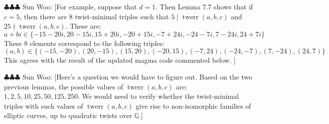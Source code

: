 \documentclass[12pt]{amsart}
\numberwithin{equation}{section} %
\theoremstyle{definition} \newtheorem{definition}[counter]{Definition}
\theoremstyle{remark} \newtheorem{nonexam}[counter]{Non-example}
\newcommand{\spark}[1]{{\color{olive} \sf
    $\clubsuit\clubsuit\clubsuit$ Sun Woo: [#1]}}
\DeclareMathOperator{\twerr}{twerr} %
\begin{document}
\spark{For example, suppose that $d=1$. Then Lemma 7.7 shows that if $c = 5$, then there are $8$ twist-minimal triples such that $5 \mid \twerr(a,b,c)$ and $25 \nmid \twerr(a,b,c)$. These are: 
\begin{equation*}
    a+bi \in \{-15-20i, 20-15i, 15 + 20i, -20+15i, -7 + 24i, -24-7i, 7 - 24i, 24 + 7i\}
\end{equation*}
These 8 elements correspond to the following triples:
\begin{equation*}
    (a,b) \in \{(-15,-20),(20,-15),(15,20),(-20,15),(-7,24),(-24,-7),(7,-24),(24,7)\}
\end{equation*}
This agrees with the result of the updated magma code commented below.
}



\spark{Here's a question we would have to figure out. Based on the two previous lemmas, the possible values of $\twerr(a,b,c)$ are: $1, 2, 5, 10, 25, 50, 125, 250$. We would need to verify whether the twist-minimal triples with such values of $\twerr(a,b,c)$ give rise to non-isomorphic families of elliptic curves, up to quadratic twists over $\mathbb{Q}$.}

\clearpage
{} 
\end{document}
